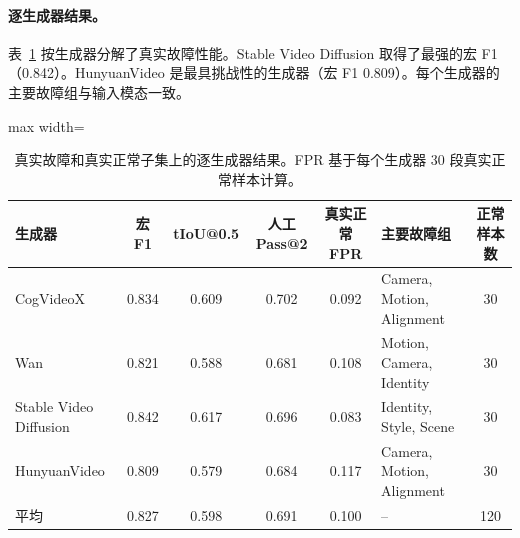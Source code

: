 \documentclass{article}
\begin{document}
\begin{table}[t]
\centering\scriptsize
\caption{真实故障和真实正常子集上的逐生成器结果。FPR 基于每个生成器 30 段真实正常样本计算。}
\paragraph{逐生成器结果。}
表~\ref{tab:per_generator_results} 按生成器分解了真实故障性能。Stable Video Diffusion 取得了最强的宏 F1（0.842）。HunyuanVideo 是最具挑战性的生成器（宏 F1 0.809）。每个生成器的主要故障组与输入模态一致。

\label{tab:per_generator_results}
\begin{adjustbox}{max width=\textwidth}
\begin{tabular}{lcccclc}
\toprule
生成器 & 宏 F1 & tIoU@0.5 & 人工 Pass@2 & 真实正常 FPR & 主要故障组 & 正常样本数 \\
\midrule
CogVideoX & 0.834 & 0.609 & 0.702 & 0.092 & Camera, Motion, Alignment & 30 \\
Wan & 0.821 & 0.588 & 0.681 & 0.108 & Motion, Camera, Identity & 30 \\
Stable Video Diffusion & 0.842 & 0.617 & 0.696 & 0.083 & Identity, Style, Scene & 30 \\
HunyuanVideo & 0.809 & 0.579 & 0.684 & 0.117 & Camera, Motion, Alignment & 30 \\
\midrule
平均 & 0.827 & 0.598 & 0.691 & 0.100 & -- & 120 \\
\bottomrule
\end{tabular}
\end{adjustbox}
\end{table}
\end{document}
